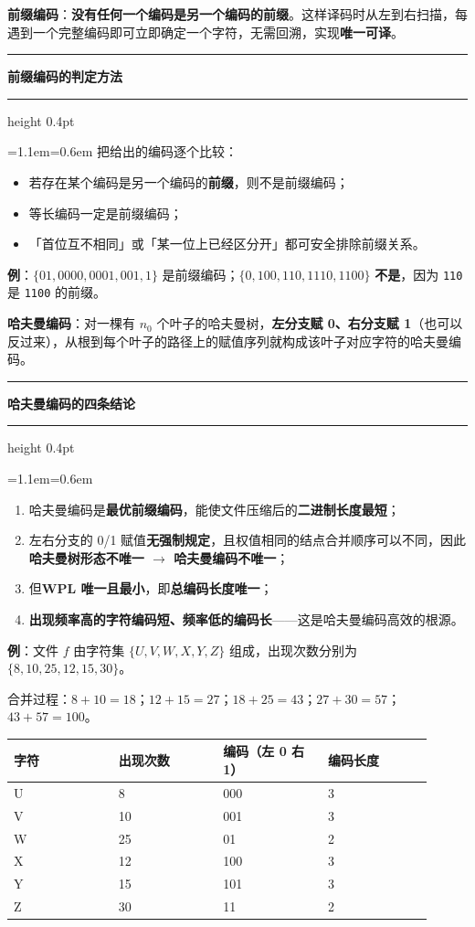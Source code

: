 \documentclass[11pt,openany,UTF8]{ctexbook}
\newcommand{\callouthead}[2]{%
  \par\addvspace{7pt}\noindent
  {\color{#1}\rule[-0.15em]{3pt}{1.05em}}\hspace{0.5em}%
  {\bfseries\color{#1}#2}\par\nobreak\vspace{-0.35em}%
  {\color{rulesep}\hrule height 0.4pt}\nobreak\vspace{0.45em}%
  \begingroup\small\setlength{\parindent}{0pt}%
  \leftskip=1.1em\rightskip=0.6em\noindent\ignorespaces}
\newcommand{\calloutend}{\par\endgroup\addvspace{7pt}}
\newenvironment{callkey}[1]{\callouthead{keybar}{#1}}{\calloutend}
\begin{document}
\textbf{前缀编码}：\textbf{没有任何一个编码是另一个编码的前缀}。这样译码时从左到右扫描，每遇到一个完整编码即可立即确定一个字符，无需回溯，实现\textbf{唯一可译}。

\begin{callkey}{前缀编码的判定方法}
把给出的编码逐个比较：

\begin{itemize}
\item 若存在某个编码是另一个编码的\textbf{前缀}，则不是前缀编码；
\item 等长编码一定是前缀编码；
\item 「首位互不相同」或「某一位上已经区分开」都可安全排除前缀关系。
\end{itemize}
\textbf{例}：$\{01,0000,0001,001,1\}$ 是前缀编码；$\{0,100,110,1110,1100\}$ \textbf{不是}，因为 \texttt{110} 是 \texttt{1100} 的前缀。

\end{callkey}

\textbf{哈夫曼编码}：对一棵有 $n_0$ 个叶子的哈夫曼树，\textbf{左分支赋 0、右分支赋 1}（也可以反过来），从根到每个叶子的路径上的赋值序列就构成该叶子对应字符的哈夫曼编码。

\begin{callkey}{哈夫曼编码的四条结论}
\begin{enumerate}
\item 哈夫曼编码是\textbf{最优前缀编码}，能使文件压缩后的\textbf{二进制长度最短}；
\item 左右分支的 0/1 赋值\textbf{无强制规定}，且权值相同的结点合并顺序可以不同，因此\textbf{哈夫曼树形态不唯一 $\to$ 哈夫曼编码不唯一}；
\item 但\textbf{WPL 唯一且最小}，即\textbf{总编码长度唯一}；
\item \textbf{出现频率高的字符编码短、频率低的编码长}——这是哈夫曼编码高效的根源。
\end{enumerate}
\end{callkey}

\textbf{例}：文件 $f$ 由字符集 $\{U,V,W,X,Y,Z\}$ 组成，出现次数分别为 $\{8,10,25,12,15,30\}$。

合并过程：$8+10=18$；$12+15=27$；$18+25=43$；$27+30=57$；$43+57=100$。

\begingroup\small\setlength{\tabcolsep}{4.0pt}
\begin{longtable}{@{}L{0.2278\linewidth}L{0.2278\linewidth}L{0.2278\linewidth}L{0.2278\linewidth}@{}}
\toprule
\textbf{字符} & \textbf{出现次数} & \textbf{编码（左 0 右 1）} & \textbf{编码长度} \\
\midrule
\endhead
U & 8 & 000 & 3 \\
V & 10 & 001 & 3 \\
W & 25 & 01 & 2 \\
X & 12 & 100 & 3 \\
Y & 15 & 101 & 3 \\
Z & 30 & 11 & 2 \\
\bottomrule
\end{longtable}
\endgroup
\end{document}
